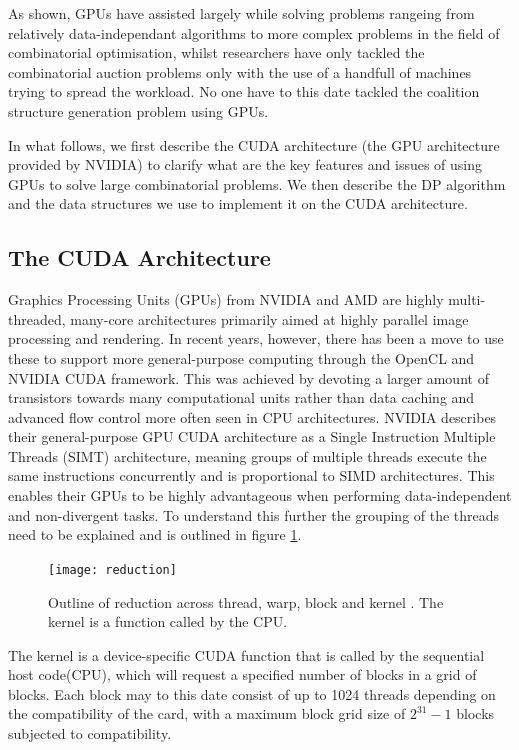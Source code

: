 \documentclass[a4paper, 12pt]{report}
\begin{document}
As shown, GPUs have assisted largely while solving problems rangeing from relatively data-independant algorithms to more complex problems in the field of
combinatorial optimisation, whilst researchers have only tackled the combinatorial auction problems only with the use of a handfull of machines trying to spread
the workload. No one have to this date tackled the coalition structure generation problem using GPUs.

In what follows, we first describe the CUDA architecture (the GPU architecture provided by NVIDIA) to clarify what 
are the key features and issues of using GPUs to solve large combinatorial problems.
We then describe the DP algorithm and the data structures we use to implement it on the CUDA architecture.

\subsection{The CUDA Architecture} \label{Cuda} %
Graphics Processing Units (GPUs) from NVIDIA and AMD are highly multi-threaded, many-core architectures primarily 
aimed at highly parallel image processing and rendering. In recent years, however, 
there has been a move to use these to support more general-purpose computing through the OpenCL and NVIDIA CUDA framework.
This was achieved by devoting a larger amount of transistors towards many computational units rather than data caching and advanced 
flow control more often seen in CPU architectures. NVIDIA describes their general-purpose GPU CUDA architecture as a Single Instruction 
Multiple Threads (SIMT) architecture, meaning groups of multiple threads execute the same instructions concurrently and is proportional to SIMD architectures. 
This enables their GPUs to be highly advantageous when performing data-independent and non-divergent tasks. 
To understand this further the grouping of the threads need to be explained and is outlined in figure \ref{fig:reduction}.
\begin{figure}
\centering
\texttt{[image: reduction]}
\caption{Outline of reduction across thread, warp, block and kernel \label{fig:reduction}. The kernel is a function called by the CPU.}
\end{figure}
The kernel is a device-specific CUDA function that is called by the sequential host code(CPU), 
which will request a specified number of blocks in a grid of blocks. 
Each block may to this date consist of up to 1024 threads depending on the compatibility of the card, 
with a maximum block grid size of $2^{31}-1$ blocks subjected to compatibility. 
\end{document}
